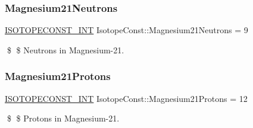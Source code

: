 \subsubsection{\texorpdfstring{Magnesium21\+Neutrons}{Magnesium21Neutrons}}
{\footnotesize\ttfamily \mbox{\hyperlink{group___isotope_const-_macros_ga5f18360b3e99483a35c32d789e62621c}{I\+S\+O\+T\+O\+P\+E\+C\+O\+N\+S\+T\+\_\+\+I\+NT}} Isotope\+Const\+::\+Magnesium21\+Neutrons = 9}

\$ \$ Neutrons in Magnesium-\/21. \mbox{\label{group___isotope_const-_magnesium-_mg21_ga085b8b0971d5c1eb129483cf4bc553dd}} 
\subsubsection{\texorpdfstring{Magnesium21\+Protons}{Magnesium21Protons}}
{\footnotesize\ttfamily \mbox{\hyperlink{group___isotope_const-_macros_ga5f18360b3e99483a35c32d789e62621c}{I\+S\+O\+T\+O\+P\+E\+C\+O\+N\+S\+T\+\_\+\+I\+NT}} Isotope\+Const\+::\+Magnesium21\+Protons = 12}

\$ \$ Protons in Magnesium-\/21. 